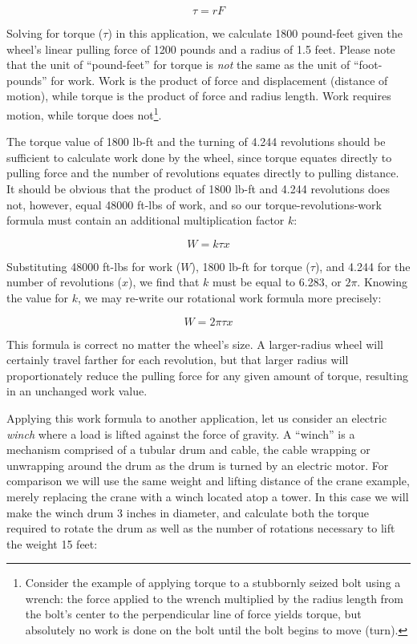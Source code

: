 $$\tau = r F$$

Solving for torque ($\tau$) in this application, we calculate 1800 pound-feet given the wheel's linear pulling force of 1200 pounds and a radius of 1.5 feet.  Please note that the unit of ``pound-feet'' for torque is \textit{not} the same as the unit of ``foot-pounds'' for work.  Work is the product of force and displacement (distance of motion), while torque is the product of force and radius length.  Work requires motion, while torque does not\footnote{Consider the example of applying torque to a stubbornly seized bolt using a wrench: the force applied to the wrench multiplied by the radius length from the bolt's center to the perpendicular line of force yields torque, but absolutely no work is done on the bolt until the bolt begins to move (turn).}.

The torque value of 1800 lb-ft and the turning of 4.244 revolutions should be sufficient to calculate work done by the wheel, since torque equates directly to pulling force and the number of revolutions equates directly to pulling distance.  It should be obvious that the product of 1800 lb-ft and 4.244 revolutions does not, however, equal 48000 ft-lbs of work, and so our torque-revolutions-work formula must contain an additional multiplication factor $k$:

$$W = k \tau x$$

Substituting 48000 ft-lbs for work ($W$), 1800 lb-ft for torque ($\tau$), and 4.244 for the number of revolutions ($x$), we find that $k$ must be equal to 6.283, or $2 \pi$.  Knowing the value for $k$, we may re-write our rotational work formula more precisely:

$$W = 2 \pi \tau x$$

This formula is correct no matter the wheel's size.  A larger-radius wheel will certainly travel farther for each revolution, but that larger radius will proportionately reduce the pulling force for any given amount of torque, resulting in an unchanged work value.

\vskip 10pt

\filbreak

Applying this work formula to another application, let us consider an electric \textit{winch} where a load is lifted against the force of gravity.  A ``winch'' is a mechanism comprised of a tubular drum and cable, the cable wrapping or unwrapping around the drum as the drum is turned by an electric motor.  For comparison we will use the same weight and lifting distance of the crane example, merely replacing the crane with a winch located atop a tower.  In this case we will make the winch drum 3 inches in diameter, and calculate both the torque required to rotate the drum as well as the number of rotations necessary to lift the weight 15 feet:  

